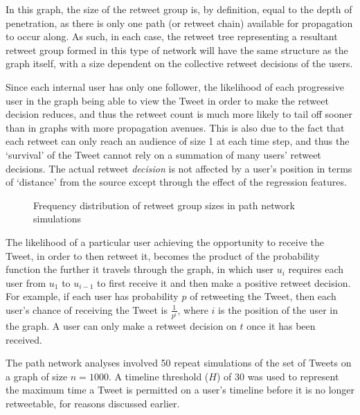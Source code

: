 In this graph, the size of the retweet group is, by definition, equal to the depth of penetration, as there is only one path (or retweet chain) available for propagation to occur along. As such, in each case, the retweet tree representing a resultant retweet group formed in this type of network will have the same structure as the graph itself, with a size dependent on the collective retweet decisions of the users.

Since each internal user has only one follower, the likelihood of each progressive user in the graph being able to view the Tweet in order to make the retweet decision reduces, and thus the retweet count is much more likely to tail off sooner than in graphs with more propagation avenues. This is also due to the fact that each retweet can only reach an audience of size 1 at each time step, and thus the `survival' of the Tweet cannot rely on a summation of many users' retweet decisions. The actual retweet \textit{decision} is not affected by a user's position in terms of `distance' from the source except through the effect of the regression features.

\begin{figure}[h]
\centering
{}
\caption{Frequency distribution of retweet group sizes in path network simulations}
\label{fig:linear}
\end{figure}

The likelihood of a particular user achieving the opportunity to receive the Tweet, in order to then retweet it, becomes the product of the probability function the further it travels through the graph, in which user $u_i$ requires each user from $u_1$ to $u_{i-1}$ to first receive it and then make a positive retweet decision. For example, if each user has probability $p$ of retweeting the Tweet, then each user's chance of receiving the Tweet is $\frac{1}{p^i}$, where $i$ is the position of the user in the graph. A user can only make a retweet decision on $t$ once it has been received.

The path network analyses involved 50 repeat simulations of the set of Tweets on a graph of size $n = 1000$. A timeline threshold ($H$) of 30 was used to represent the maximum time a Tweet is permitted on a user's timeline before it is no longer retweetable, for reasons discussed earlier. 

